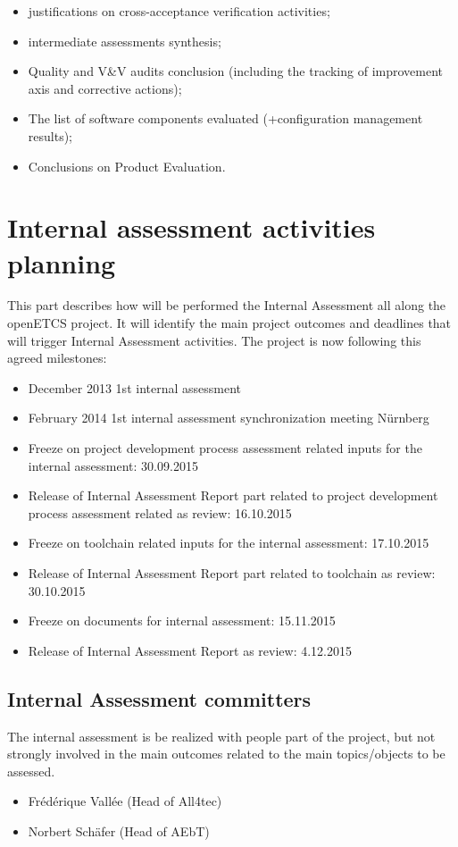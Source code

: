 \documentclass[openetcs]{template/openetcs_article}
\begin{document}
\begin{itemize}
\item justifications on cross-acceptance verification activities;
\item intermediate assessments synthesis;
\item Quality and V\&V audits conclusion (including the tracking of improvement axis and corrective actions);
\item The list of software components evaluated (+configuration management results);
\item Conclusions on Product Evaluation.
\end{itemize}

\section{Internal assessment activities planning}
This part describes how will be performed the Internal Assessment all along the openETCS project. It will identify the main project outcomes and deadlines that will trigger Internal Assessment activities. The project is now following this agreed milestones:

\begin{itemize}
\item December 2013 1st internal assessment
\item February 2014 1st internal assessment synchronization meeting N\"urnberg
\item Freeze on project development process assessment related inputs for the internal assessment: 30.09.2015
\item Release of Internal Assessment Report part related to project development process assessment related as review: 16.10.2015
\item Freeze on toolchain related inputs for the internal assessment: 17.10.2015
\item Release of Internal Assessment Report part related to toolchain as review: 30.10.2015
\item Freeze on documents for internal assessment: 15.11.2015
\item Release of Internal Assessment Report as review: 4.12.2015
\end{itemize}

\subsection{Internal Assessment committers}
The internal assessment is be realized with people part of the project, but not strongly involved in the main outcomes related to the main topics/objects to be assessed.
\begin{itemize}
\item Fr\'ed\'erique Vall\'ee (Head of All4tec)
\item Norbert Sch\"afer (Head of AEbT)
\end{itemize}
\end{document}
